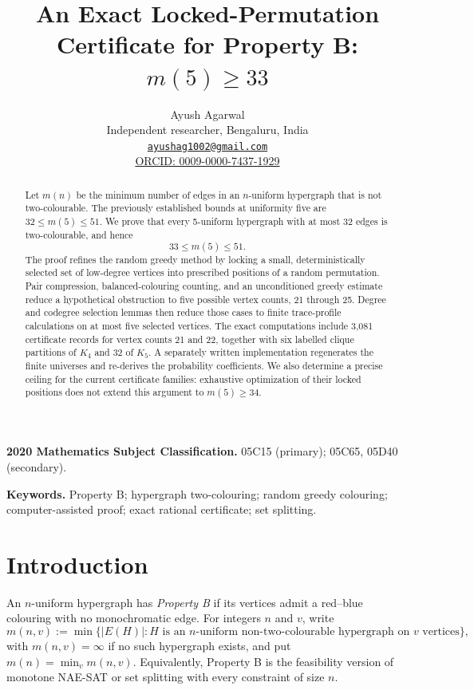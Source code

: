 \documentclass[11pt]{article}
\title{An Exact Locked-Permutation Certificate for Property B:\\
       \texorpdfstring{$m(5)\ge 33$}{m(5) >= 33}}
\author{Ayush Agarwal\\
\small Independent researcher, Bengaluru, India\\
\small \href{mailto:ayushag1002@gmail.com}{\texttt{ayushag1002@gmail.com}}\\
\small \href{https://orcid.org/0009-0000-7437-1929}%
{ORCID: 0009-0000-7437-1929}}
\date{}
\theoremstyle{remark}
\begin{document}
\maketitle

\begin{abstract}
Let $m(n)$ be the minimum number of edges in an $n$-uniform hypergraph
that is not two-colourable.  The previously established bounds at
uniformity five are $32\le m(5)\le51$.  We prove that every 5-uniform
hypergraph with at most 32 edges is two-colourable, and hence
\[
33\le m(5)\le51.
\]
The proof refines the random greedy method by locking a small,
deterministically selected set of low-degree vertices into prescribed
positions of a random permutation.  Pair compression, balanced-colouring
counting, and an unconditioned greedy estimate reduce a hypothetical
obstruction to five possible vertex counts, 21 through 25.  Degree and
codegree selection lemmas then reduce those cases to finite trace-profile
calculations on at most five selected vertices.  The exact computations
include 3,081 certificate records for vertex counts 21 and 22, together with
six labelled clique partitions of $K_4$ and 32 of $K_5$.  A separately
written implementation regenerates the finite universes and re-derives the
probability coefficients.  We also determine a precise ceiling for the
current certificate families: exhaustive optimization of their locked
positions does not extend this argument to $m(5)\ge34$.
\end{abstract}

\noindent\textbf{2020 Mathematics Subject Classification.}
05C15 (primary); 05C65, 05D40 (secondary).

\smallskip
\noindent\textbf{Keywords.}
Property B; hypergraph two-colouring; random greedy colouring;
computer-assisted proof; exact rational certificate; set splitting.

\section{Introduction}\label{sec:introduction}

An $n$-uniform hypergraph has \emph{Property B} if its vertices admit a
red--blue colouring with no monochromatic edge.  For integers $n$ and $v$,
write
\[
m(n,v):=\min\{|E(H)|:H\text{ is an $n$-uniform non-two-colourable
hypergraph on $v$ vertices}\},
\]
with $m(n,v)=\infty$ if no such hypergraph exists, and put
$m(n)=\min_v m(n,v)$.  Equivalently, Property B is the feasibility version
of monotone NAE-SAT or set splitting with every constraint of size $n$.
\end{document}
